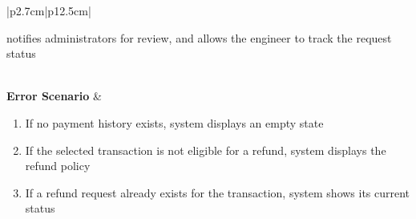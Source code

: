 \begin{table}[H]
\begin{tabular}{|p{2.7cm}|p{12.5cm}|}
\begin{minipage}[t]{\linewidth}
\begin{enumerate}[topsep=0pt,itemsep=1pt,parsep=0pt,partopsep=0pt]
                                                    notifies administrators for review, and allows the engineer to track the
                                                    request status
                                          \end{enumerate}
                                      \end{minipage}                                                 \\
            \hline
            \textbf{Error Scenario} & \begin{minipage}[t]{\linewidth}
                                          \begin{enumerate}[topsep=0pt,itemsep=1pt,parsep=0pt,partopsep=0pt]
                                              \item If no payment history exists, system displays an empty state
                                              \item If the selected transaction is not eligible for a refund, system displays the
                                                    refund policy
                                              \item If a refund request already exists for the transaction, system shows its
                                                    current status
                                          \end{enumerate}
                                      \end{minipage}                                                  \\
            \hline
        \end{tabular}
        \label{tab:eng-payment-history}
    \end{table}

